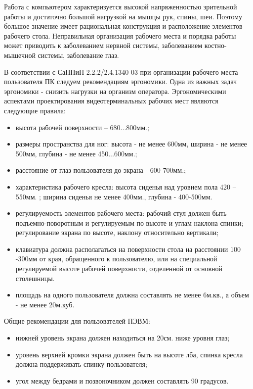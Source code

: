 Работа с компьютером характеризуется высокой напряженностью зрительной работы и достаточно большой нагрузкой на мышцы рук, спины, шеи. Поэтому большое значение имеет рациональная конструкция и расположение элементов рабочего стола. Неправильная организация рабочего места и порядка работы может приводить к заболеванием нервной системы, заболеванием костно-мышечной системы, заболевание глаз.

В соответствии с СаНПиН 2.2.2/2.4.1340-03 при организации рабочего места пользователя ПК следуем рекомендациям эргономики. Одна из важных задач эргономики - снизить нагрузки на организм оператора. Эргономическими аспектами проектирования видеотерминальных рабочих мест являются следующие правила:
\begin{itemize}
\item высота рабочей поверхности – 680...800мм.;
\item размеры пространства для ног: высота - не менее 600мм, ширина - не менее 500мм, глубина - не менее 450...600мм.;
\item расстояние от глаз пользователя до экрана - 600-700мм.;
\item характеристика рабочего кресла:  высота сиденья над уровнем пола 420 – 550мм. ; ширина сиденья не менее 400мм., глубина - 400-500мм.
\item регулируемость элементов рабочего места: рабочий стул должен быть подъемно-поворотным и регулируемым по высоте и углам наклона спинки; регулирование экрана по высоте, наклону относительно вертикали;
\item клавиатура должна располагаться на поверхности стола на расстоянии 100 -300мм от края, обращенного к пользователю, или на специальной регулируемой высоте рабочей поверхности, отделенной от основной столешницы.
\item площадь на одного пользователя должна составлять не менее 6м.кв., а объем - не менее 20м.куб.
\end{itemize}

Общие рекомендации для пользователей ПЭВМ:
\begin{itemize}
\item нижней уровень экрана должен находиться на 20см. ниже уровня глаз;
\item уровень верхней кромки экрана должен быть на высоте лба, 
спинка кресла должна поддерживать спинку пользователя;
\item угол между бедрами и позвоночником должен составлять 90 градусов.
\end{itemize}

